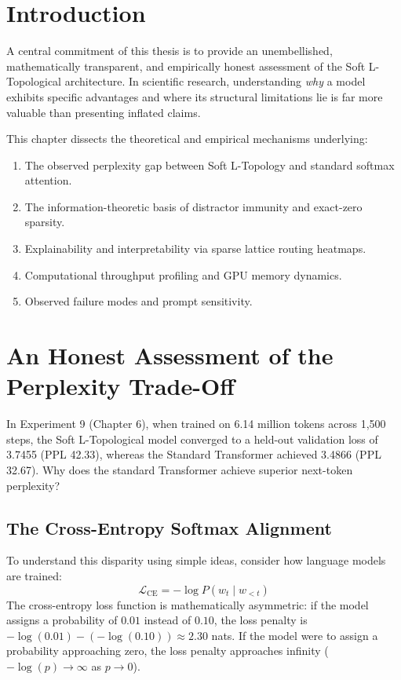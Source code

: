 \label{chap:discussion}

\section{Introduction}
A central commitment of this thesis is to provide an unembellished, mathematically transparent, and empirically honest assessment of the Soft L-Topological architecture. In scientific research, understanding \textit{why} a model exhibits specific advantages and where its structural limitations lie is far more valuable than presenting inflated claims.

This chapter dissects the theoretical and empirical mechanisms underlying:
\begin{enumerate}
    \item The observed perplexity gap between Soft L-Topology and standard softmax attention.
    \item The information-theoretic basis of distractor immunity and exact-zero sparsity.
    \item Explainability and interpretability via sparse lattice routing heatmaps.
    \item Computational throughput profiling and GPU memory dynamics.
    \item Observed failure modes and prompt sensitivity.
\end{enumerate}

\section{An Honest Assessment of the Perplexity Trade-Off}
In Experiment 9 (Chapter 6), when trained on 6.14 million tokens across 1,500 steps, the Soft L-Topological model converged to a held-out validation loss of 3.7455 (PPL 42.33), whereas the Standard Transformer achieved 3.4866 (PPL 32.67). Why does the standard Transformer achieve superior next-token perplexity?

\subsection{The Cross-Entropy Softmax Alignment}
To understand this disparity using simple ideas, consider how language models are trained:
\begin{equation}
\mathcal{L}_{\text{CE}} = -\log P(w_t \mid w_{<t})
\end{equation}
The cross-entropy loss function is mathematically asymmetric: if the model assigns a probability of $0.01$ instead of $0.10$, the loss penalty is $-\log(0.01) - (-\log(0.10)) \approx 2.30$ nats. If the model were to assign a probability approaching zero, the loss penalty approaches infinity ($-\log(p) \to \infty$ as $p \to 0$).

